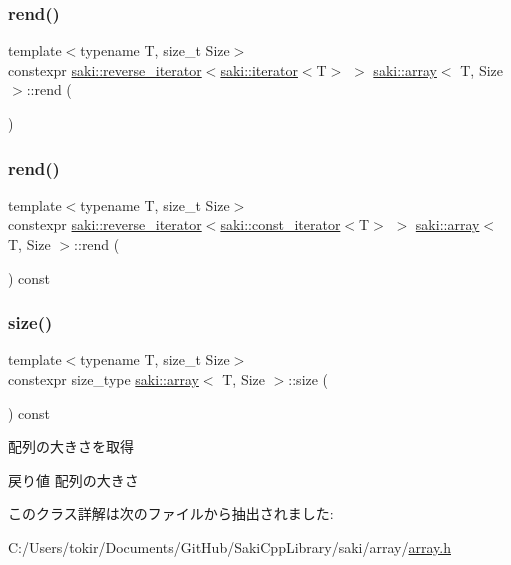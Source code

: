 \subsubsection{\texorpdfstring{rend()}{rend()}\hspace{0.1cm}{\footnotesize\ttfamily [1/2]}}
{\footnotesize\ttfamily template$<$typename T, size\+\_\+t Size$>$ \\
constexpr \mbox{\hyperlink{classsaki_1_1reverse__iterator}{saki\+::reverse\+\_\+iterator}}$<$\mbox{\hyperlink{classsaki_1_1iterator}{saki\+::iterator}}$<$T$>$ $>$ \mbox{\hyperlink{classsaki_1_1array}{saki\+::array}}$<$ T, Size $>$\+::rend (\begin{DoxyParamCaption}{ }\end{DoxyParamCaption})\hspace{0.3cm}{\ttfamily [inline]}}

\mbox{\label{classsaki_1_1array_a6816a951bfc1e6b13aec4fd54ec0bf63}} 
\subsubsection{\texorpdfstring{rend()}{rend()}\hspace{0.1cm}{\footnotesize\ttfamily [2/2]}}
{\footnotesize\ttfamily template$<$typename T, size\+\_\+t Size$>$ \\
constexpr \mbox{\hyperlink{classsaki_1_1reverse__iterator}{saki\+::reverse\+\_\+iterator}}$<$\mbox{\hyperlink{classsaki_1_1const__iterator}{saki\+::const\+\_\+iterator}}$<$T$>$ $>$ \mbox{\hyperlink{classsaki_1_1array}{saki\+::array}}$<$ T, Size $>$\+::rend (\begin{DoxyParamCaption}{ }\end{DoxyParamCaption}) const\hspace{0.3cm}{\ttfamily [inline]}}

\mbox{\label{classsaki_1_1array_ae9f4ac2980f19263ef29ac1dca694fed}} 
\subsubsection{\texorpdfstring{size()}{size()}}
{\footnotesize\ttfamily template$<$typename T, size\+\_\+t Size$>$ \\
constexpr size\+\_\+type \mbox{\hyperlink{classsaki_1_1array}{saki\+::array}}$<$ T, Size $>$\+::size (\begin{DoxyParamCaption}{ }\end{DoxyParamCaption}) const\hspace{0.3cm}{\ttfamily [inline]}}



配列の大きさを取得 

\begin{DoxyReturn}{戻り値}
配列の大きさ 
\end{DoxyReturn}


このクラス詳解は次のファイルから抽出されました\+:\begin{DoxyCompactItemize}
\item 
C\+:/\+Users/tokir/\+Documents/\+Git\+Hub/\+Saki\+Cpp\+Library/saki/array/\mbox{\hyperlink{array_2array_8h}{array.\+h}}\end{DoxyCompactItemize}
